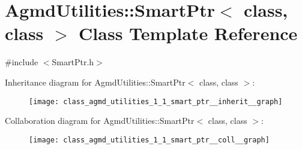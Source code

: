 \hypertarget{class_agmd_utilities_1_1_smart_ptr}{\section{Agmd\+Utilities\+:\+:Smart\+Ptr$<$ class, class $>$ Class Template Reference}
\label{class_agmd_utilities_1_1_smart_ptr}
}


{\ttfamily \#include $<$Smart\+Ptr.\+h$>$}



Inheritance diagram for Agmd\+Utilities\+:\+:Smart\+Ptr$<$ class, class $>$\+:\nopagebreak
\begin{figure}[H]
\begin{center}
\leavevmode
\texttt{[image: class\_agmd\_utilities\_1\_1\_smart\_ptr\_\_inherit\_\_graph]}
\end{center}
\end{figure}


Collaboration diagram for Agmd\+Utilities\+:\+:Smart\+Ptr$<$ class, class $>$\+:\nopagebreak
\begin{figure}[H]
\begin{center}
\leavevmode
\texttt{[image: class\_agmd\_utilities\_1\_1\_smart\_ptr\_\_coll\_\_graph]}
\end{center}
\end{figure}
